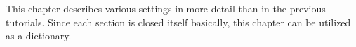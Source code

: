 This chapter describes various settings in more detail 
than in the previous tutorials.
Since each section is closed itself basically,
this chapter can be utilized as a dictionary.

